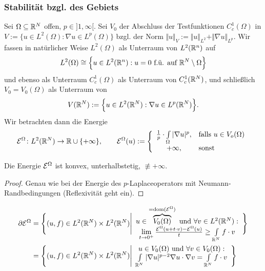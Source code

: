\subsubsection{Stabilität bzgl. des Gebiets}

Sei $\Omega\subseteq\mathbb{R}^N$ offen, $p\in]1,\infty[$.
Sei $V_0$ der Abschluss der Testfunktionen $C_c^1(\Omega)$ in\\
$V:=\big\lbrace u\in L^2(\Omega):\nabla u\in L^p(\Omega)\big\rbrace$ bzgl. der Norm 
$\Vert u\Vert_V:=\Vert u\Vert_{L^2}+\Vert\nabla u\Vert_{L^p}$.
Wir fassen in natürlicher Weise $L^2(\Omega)$ als Unterraum von $L^2(\mathbb{R}^n)$ auf
\begin{align*}
	L^2(\Omega)\cong\Big\lbrace u\in L^2(\mathbb{R}^n):u=0\text{ f.ü. auf }\mathbb{R}^N\setminus\Omega\Big\rbrace
\end{align*}
und ebenso als Unterraum $C_c^1(\Omega)$ als Unterraum von $C_c^1(\mathbb{R}^N)$, 
und schließlich $V_0=V_0(\Omega)$ als Unterraum von
\begin{align*}
	V(\mathbb{R}^N):=\Big\lbrace u\in L^2(\mathbb{R}^N):\nabla u\in L^p(\mathbb{R}^N)\Big\rbrace.
\end{align*}
Wir betrachten dann die Energie 
\begin{align*}
	\mathcal{E}^\Omega\colon L^2(\mathbb{R}^N)\to\mathbb{R}\cup\lbrace+\infty\rbrace,\qquad
	\mathcal{E}^\Omega(u):=\left\lbrace\begin{array}{cl}
		\frac{1}{p}\cdot\int\limits_\Omega|\nabla u|^p,&\text{falls } u\in V_o(\Omega)\\
		+\infty,&\text{sonst }
	\end{array}\right.
\end{align*}

Die Energie $\mathcal{E}^\Omega$ ist konvex, unterhalbstetig, $\not\equiv+\infty$.

\begin{proof}
	Genau wie bei der Energie des $p$-Laplaceoperators mit Neumann-\\
	Randbedingungen (Reflexivität geht ein).
\end{proof}

\begin{align*}
	\partial\mathcal{E}^\Omega&=\Bigg\lbrace(u,f)\in L^2(\mathbb{R}^N)\times L^2(\mathbb{R}^N)\Bigg|
	\begin{array}{c}
		u\in\overbrace{V_0(\Omega)}^{=\operatorname{dom}(\mathcal{E}^\Omega)}\text{ und }\forall v\in L^2(\mathbb{R}^N):\\
		\lim\limits_{t\to 0^+}\frac{\mathcal{E}^\Omega(u+t\cdot v)-\mathcal{E}^\Omega(u)}{t}\geq\int\limits_{\mathbb{R}^N} f\cdot v
	\end{array}\Bigg\rbrace\\
	&=\Bigg\lbrace(u,f)\in L^2(\mathbb{R}^N)\times L^2(\mathbb{R}^N)\Bigg|
	\begin{array}{c}
		u\in V_0(\Omega)\text{ und }\forall v\in V_0(\Omega):\\
		\int\limits_{\mathbb{R}^N}|\nabla u|^{p-2}\nabla u\cdot\nabla v=\int\limits_{\mathbb{R}^N} f\cdot v
	\end{array}		
	\Bigg\rbrace
\end{align*}

